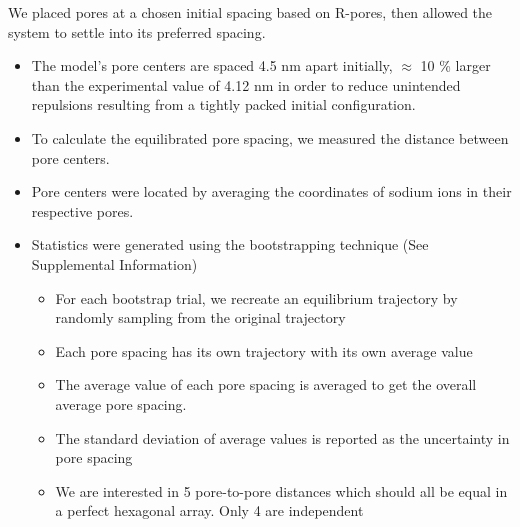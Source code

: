\documentclass{article}
\begin{document}
  We placed pores at a chosen initial spacing based on R-pores, then allowed
  the system to settle into its preferred spacing. 
  \begin{itemize}
    \item The model's pore centers are spaced 4.5 nm apart initially, $\approx$ 10 \% larger
    than the experimental value of 4.12 nm in order to reduce unintended repulsions 
    resulting from a tightly packed initial configuration.
    \item To calculate the equilibrated pore spacing, we measured the distance between pore
    centers.
    \item Pore centers were located by averaging the coordinates of sodium ions in their 
    respective pores.
    \item Statistics were generated using the bootstrapping technique (See Supplemental Information)
	\begin{itemize}
    	\item For each bootstrap trial, we recreate an equilibrium trajectory by randomly 
    	sampling from the original trajectory
    	\item Each pore spacing has its own trajectory with its own average value
    	\item The average value of each pore spacing is averaged to get the overall
    	average pore spacing. 
    	\item The standard deviation of average values is reported as the uncertainty in pore spacing
        \item We are interested in 5 pore-to-pore distances which should all be equal in 
        a perfect hexagonal array. Only 4 are independent  
	\end{itemize}
  \end{itemize}
  
  
\end{document}
